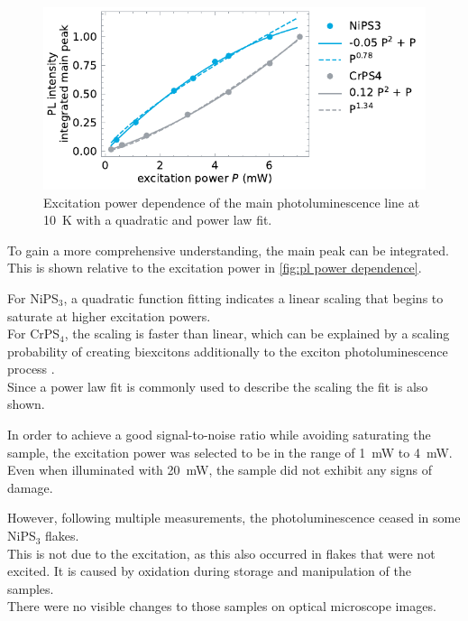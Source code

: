 \documentclass[
	twoside,
	parskip=half,
	a4paper,
]{scrbook}
\begin{document}
\begin{figure}
	\centering
	\includegraphics{../figures/2024-04-19 excitation power dependence of main pl line.pdf}
	\caption{Excitation power dependence of the main photoluminescence line at \SI{10}{K} with a quadratic and power law fit. }
	\label{fig:pl power dependence}
\end{figure}
To gain a more comprehensive understanding, the main peak can be integrated.
This is shown relative to the excitation power in \autoref{fig:pl power dependence}.

For NiPS$_3$, a quadratic function fitting indicates a linear scaling that begins to saturate at higher excitation powers.\\
For CrPS$_4$, the scaling is faster than linear, which can be explained by a scaling probability of creating biexcitons additionally to the exciton photoluminescence process \cite{biexciton}. \\
Since a power law fit is commonly used to describe the scaling the fit is also shown.

In order to achieve a good signal-to-noise ratio while avoiding saturating the sample, the excitation power was selected to be in the range of \SI{1}{mW} to \SI{4}{mW}.\\
Even when illuminated with \SI{20}{mW}, the sample did not exhibit any signs of damage.

However, following multiple measurements, the photoluminescence ceased in some NiPS$_3$ flakes.\\
This is not due to the excitation, as this also occurred in flakes that were not excited.
It is caused by oxidation during storage and manipulation of the samples.\\
There were no visible changes to those samples on optical microscope images.
\end{document}
